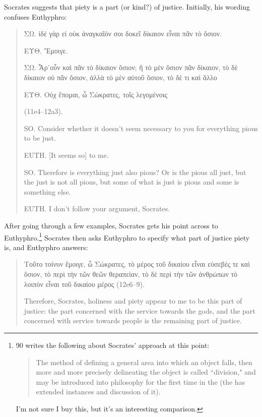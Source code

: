 \documentclass[11pt]{article}
\begin{document}
Socrates suggests that piety is a part (or kind?) of justice. Initially, his wording confuses Euthyphro:

\begin{quote}
    {\g ΣΩ. ἰδὲ γὰρ εἰ οὐκ ἀναγκαῖόν σοι δοκεῖ δίκαιον εἶναι πᾶν τὸ ὅσιον.

        ΕΥΘ. Ἔμοιγε.

        ΣΩ. Ἆρ᾽οὖν καὶ πᾶν τὸ δίκαιον ὅσιον; ἢ τὸ μὲν ὅσιον πᾶν δίκαιον, τὸ δὲ δίκαιον οὐ πᾶν ὅσιον, ἀλλὰ τὸ μὲν αὐτοῦ ὅσιον, τὸ δὲ τι καὶ ἄλλο

    ΕΥΘ. Οὐχ ἕπομαι, ὦ Σώκρατες, τοῖς λεγομένοις} (11e4--12a3).

    SO. Consider whether it doesn't seem necessary to you for everything pious to be just.

    EUTH. [It seems so] to me.

    SO. Therefore is everything just also pious? Or is the pious all just, but the just is not all pious, but some of what is just is pious and some is something else.

    EUTH. I don't follow your argument, Socrates.
\end{quote}

After going through a few examples, Socrates gets his point across to Euthyphro.\footnote{\citet{bailly2003} 90 writes the following about Socrates' approach at this point:

\begin{quote}
    The method of defining a general area into which an object falls, then more and more precisely delineating the object is called ``division," and may be introduced into philosophy for the first time in the  (the  has extended instances and discussion of it).
\end{quote}

I'm not sure I buy this, but it's an interesting comparison.}  Socrates then asks Euthyphro to specify what part of justice piety is, and Euthyphro answers:

\begin{quote}
    {\g Τοῦτο τοίνυν ἔμοιγε, ὦ Σώκρατες, τὸ μέρος τοῦ δικαίου εἶναι εὐσεβές τε καὶ ὅσιον, τὸ περὶ τὴν τῶν θεῶν θεραπείαν, τὸ δὲ περὶ τὴν τῶν ἀνθρώπων τὸ λοιπὸν εἶναι τοῦ δικαίου μέρος} (12e6--9).

    Therefore, Socrates, holiness and piety appear to me to be this part of justice: the part concerned with the service towards the gods, and the part concerned with service towards people is the remaining part of justice.
\end{quote}
\end{document}
